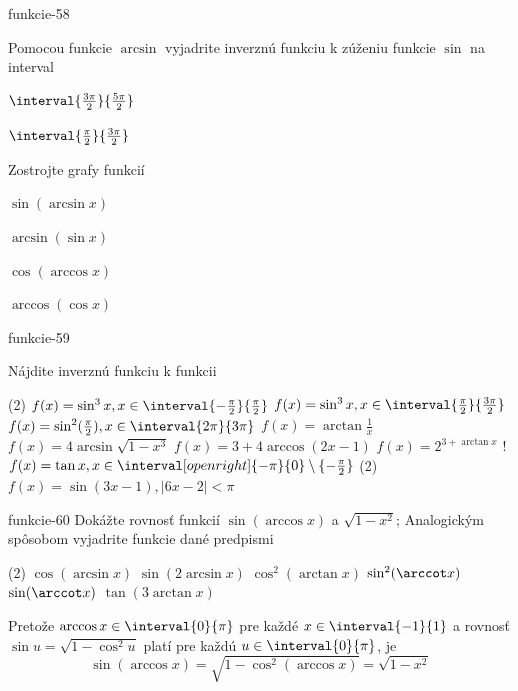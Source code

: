 \begin{defproblem}{funkcie-58}
\begin{tasks}
\task
  Pomocou funkcie $\arcsin$ vyjadrite inverznú funkciu k zúženiu funkcie
  $\sin$ na interval
  \begin{enumerate*}
    \item $\interval{\frac{3\pi}{2}}{\frac{5\pi}{2}}$
    \item $\interval{\frac{\pi}{2}}{\frac{3\pi}{2}}$
  \end{enumerate*}
\task
  Zostrojte grafy funkcií

  \begin{enumerate*}
    \item $\sin(\arcsin x)$
    \item $\arcsin(\sin x)$
    \item $\cos(\arccos x)$
  \end{enumerate*}

  \begin{enumerate*}[resume]
    \item $\arccos(\cos x)$
  \end{enumerate*}
\end{tasks}
\end{defproblem}

\begin{defproblem}{funkcie-59}
\begin{samepage}
Nájdite inverznú funkciu k funkcii
\begin{tasks}(2)
  \task $f(x)=\sin^3 x, x \in \interval{-\frac{\pi}{2}}{\frac{\pi}{2}}$
  \task $f(x)=\sin^3 x, x \in \interval{\frac{\pi}{2}}{\frac{3\pi}{2}}$
  \task $f(x)=\sin^2 (\frac{\pi}{2}),x \in \interval{2\pi}{3\pi}$
  \task $f(x)=\arctan\frac{1}{x}$
  \task $f(x)=4\arcsin\sqrt{1-x^3}$
  \task $f(x)=3+4\arccos(2x-1)$
  \task $f(x)=2^{3+\arctan x}$
  \task! $f(x)=\tan{x},
    x \in \interval[open right]{-\pi}{0} \setminus \{-\frac{\pi}{2}\}
  $
  \task*(2) $f(x)=\sin{(3x-1)}, |6x-2| < \pi$
\end{tasks}
\end{samepage}
\end{defproblem}

\begin{defproblem}{funkcie-60}
Dokážte rovnosť funkcií $\sin(\arccos x)$ a $\sqrt{1-x^2}$; Analogickým spôsobom
vyjadrite funkcie dané predpismi
\begin{tasks}(2)
  \task $\cos(\arcsin x)$
  \task $\sin(2\arcsin x)$
  \task $\cos^2 (\arctan x)$
  \task $\sin^2 (\arccot x)$
  \task $\sin (\arccot x)$
  \task $\tan (3\arctan x)$
\end{tasks}

\begin{solution}
  Pretože $\arccos x \in \interval{0}{\pi}$ pre každé $x \in \interval{-1}{1}$ a
  rovnosť $\sin u=\sqrt{1-\cos^2 u}$ platí pre každú $u \in \interval{0}{\pi}$,
  je
  \[\sin(\arccos x) = \sqrt{1-\cos^2(\arccos x)} = \sqrt{1-x^2}\]
\end{solution}
\end{defproblem}

